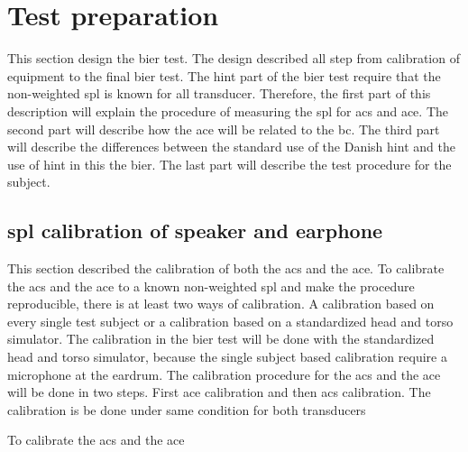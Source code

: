 \section{Test preparation}
This section design the \gls{bier} test. The design described all step from calibration of equipment to the final \gls{bier} test. The \gls{hint} part of the \gls{bier} test require that the non-weighted \gls{spl} is known for all transducer. Therefore, the first part of this description will explain the procedure of measuring the \gls{spl} for \gls{acs} and \gls{ace}. The second part will describe how the \gls{ace} will be related to the \gls{bc}. The third part will describe the differences between the standard use of the Danish \gls{hint} and the use of \gls{hint} in this the \gls{bier}. The last part will describe the test procedure for the subject. 





\subsection{\gls{spl} calibration of speaker and earphone}
This section described the calibration of both the \gls{acs} and the \gls{ace}. To calibrate the \gls{acs} and the  \gls{ace} to a known non-weighted \gls{spl} and make the procedure reproducible, there is at least two ways of calibration. A calibration based on every single test subject or a calibration based on a standardized head and torso simulator. The calibration in the \gls{bier} test will be done with the standardized head and torso simulator, because the single subject based calibration require a microphone at the eardrum. The calibration procedure for the \gls{acs} and the \gls{ace} will be done in two steps. First \gls{ace} calibration and then \gls{acs} calibration. The calibration is be done under same condition for both transducers

To calibrate the \gls{acs} and the \gls{ace} 
   

